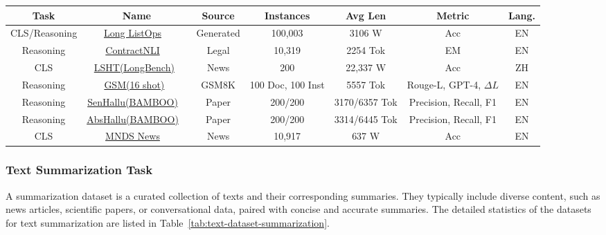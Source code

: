 \begin{table*}[]
    \renewcommand{\arraystretch}{1.3} %
    \setlength{\tabcolsep}{1pt} %
    \label{tab:text-dataset-nli-classification}
\begin{tabular}{c|c|c|c|c|c|c}
\hline
\textbf{Task} &
  \textbf{Name} &
  \textbf{Source} &
  \textbf{Instances} &
  \textbf{Avg Len} &
  \textbf{Metric} &
  \textbf{Lang.} \\ \hline
CLS/Reasoning &
  \href{https://github.com/google-research/long-range-arena}{Long ListOps} ~\cite{tay_long_lra_2020}&
  Generated&
  100,003 &
  3106 W &
  Acc &
  EN \\ \hline
Reasoning &
  \href{https://stanfordnlp.github.io/contract-nli/}{ContractNLI} ~\cite{koreeda-manning-2021-contractnli-dataset}&
  Legal &
  10,319 & %
  2254 Tok&
  EM &
  EN \\ \hline
CLS &
  \href{https://huggingface.co/datasets/THUDM/LongBench}{LSHT(LongBench)}~\cite{bai_longbench:_2023} &
  News &
  200 &
  22,337 W &
  Acc &
  ZH \\ \hline
Reasoning &
  \href{https://github.com/OpenLMLab/LEval}{GSM(16 shot)}~\cite{an_l-eval:_2023} &
  GSM8K \cite{cobbe_training——gsm8k_2021} &
  100 Doc, 100 Inst&
  5557 Tok&
  Rouge-L, GPT-4, $\Delta L$&
  EN \\ \hline
Reasoning &
  \href{https://github.com/RUCAIBox/BAMBOO/tree/main/datasets}{SenHallu(BAMBOO)} ~\cite{dong2023bamboo}&
  Paper &
  200/200 &
  3170/6357 Tok&
  Precision, Recall, F1&
  EN    \\ \hline
Reasoning &
  \href{https://github.com/RUCAIBox/BAMBOO/tree/main/datasets}{AbsHallu(BAMBOO)} ~\cite{dong2023bamboo}&
  Paper &
  200/200 &
  3314/6445 Tok&
  Precision, Recall, F1&
  EN \\ \hline
CLS &
  \href{https://github.com/alinapetukhova/mn-ds-news-classification}{MNDS News} ~\cite{petukhova_mn-ds:_2023}&
  News &
  10,917 &
  637 W &
  Acc &
  EN \\  \hline
\end{tabular}
\end{table*}


\subsubsection{Text Summarization Task}
A summarization dataset is a curated collection of texts and their corresponding summaries. They typically include diverse content, such as news articles, scientific papers, or conversational data, paired with concise and accurate summaries. 
The detailed statistics of the datasets for text summarization are listed in Table~\ref{tab:text-dataset-summarization}.

